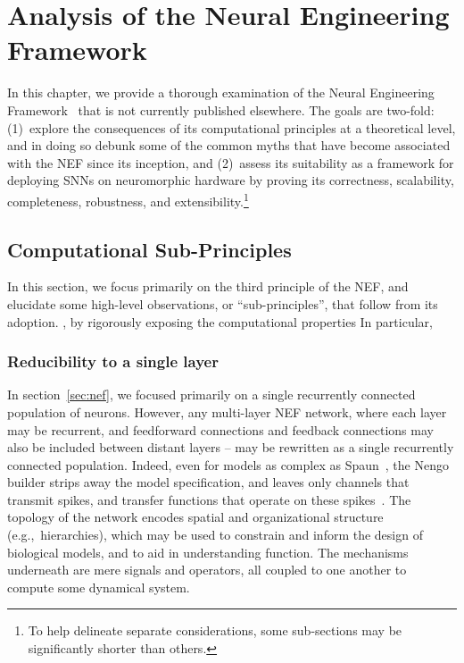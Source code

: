 \chapter{Analysis of the Neural Engineering Framework}
\label{chapt:analysis}

In this chapter, we provide a thorough examination of the Neural Engineering Framework~\citep[NEF;][]{eliasmith2003a} that is not currently published elsewhere.
The goals are two-fold: (1)~explore the consequences of its computational principles at a theoretical level, and in doing so debunk some of the common myths that have become associated with the NEF since its inception, and (2)~assess its suitability as a framework for deploying SNNs on neuromorphic hardware by proving its correctness, scalability, completeness, robustness, and extensibility.\footnote{%
To help delineate separate considerations, some sub-sections may be significantly shorter than others.
}

\section{Computational Sub-Principles}

In this section, we focus primarily on the third principle of the NEF, and elucidate some high-level observations, or ``sub-principles'', that follow from its adoption.
, by rigorously exposing the computational properties 
In particular, 

\subsection{Reducibility to a single layer}

In section~\ref{sec:nef}, we focused primarily on a single recurrently connected population of neurons.
However, any multi-layer NEF network, where each layer may be recurrent, and feedforward connections and feedback connections may also be included between distant layers -- may be rewritten as a single recurrently connected population.
Indeed, even for models as complex as Spaun~\citep{eliasmith2012, choo2018}, the Nengo builder strips away the model specification, and leaves only channels that transmit spikes, and transfer functions that operate on these spikes~\citep{bekolay2014, gosmann2017automatic}.
The topology of the network encodes spatial and organizational structure (e.g.,~hierarchies), which may be used to constrain and inform the design of biological models, and to aid in understanding function.
The mechanisms underneath are mere signals and operators, all coupled to one another to compute some dynamical system.

